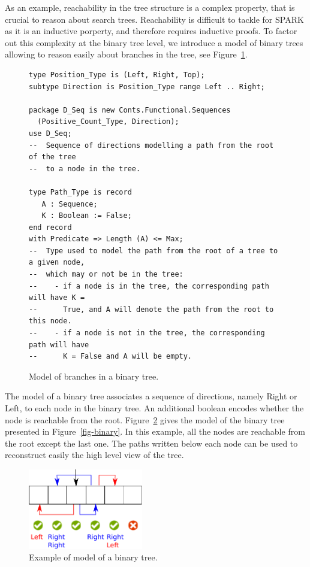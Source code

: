\documentclass[11pt,a4paper]{article}
\begin{document}
As an example, reachability in the tree structure is a complex property, that is
crucial to reason about search trees. Reachability is difficult to tackle for SPARK
as it is an inductive porperty, and therefore requires inductive proofs. To factor out
this complexity at the binary tree level, we introduce
a model of binary trees allowing to reason easily about branches in the tree, see
Figure~\ref{fig-binary-mod}.

\begin{figure}[ht]
\begin{small}
\begin{lstlisting}
type Position_Type is (Left, Right, Top);
subtype Direction is Position_Type range Left .. Right;

package D_Seq is new Conts.Functional.Sequences
  (Positive_Count_Type, Direction);
use D_Seq;
--  Sequence of directions modelling a path from the root of the tree
--  to a node in the tree.

type Path_Type is record
   A : Sequence;
   K : Boolean := False;
end record
with Predicate => Length (A) <= Max;
--  Type used to model the path from the root of a tree to a given node,
--  which may or not be in the tree:
--    - if a node is in the tree, the corresponding path will have K =
--      True, and A will denote the path from the root to this node.
--    - if a node is not in the tree, the corresponding path will have
--      K = False and A will be empty.
\end{lstlisting}
\end{small}
\caption{\label{fig-binary-mod} Model of branches in a binary tree.}
\end{figure}

The model of a binary tree associates a sequence of directions, namely
Right or Left, to each node in the binary tree. An additional boolean encodes
whether the node is reachable from the root. Figure~\ref{fig-binary-mod-ex} gives
the model of the binary tree presented in Figure~\ref{fig-binary}. In this
example, all the nodes are reachable from the root except the last one. The
paths written below each node can be used to reconstruct easily the high level
view of the tree.

\begin{figure}[ht]
\begin{center}
\includegraphics[width=5cm]{model.pdf}
\caption{\label{fig-binary-mod-ex} Example of model of a binary tree.}
\end{center}
\end{figure}
\end{document}
